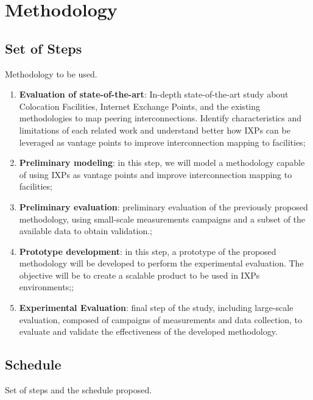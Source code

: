 \chapter{Methodology}\label{cap:methodology}
\thispagestyle{empty}

\section{Set of Steps}
\label{sec:steps}

Methodology to be used.

\begin{enumerate}
\item {\bf Evaluation of state-of-the-art}: In-depth state-of-the-art study about Colocation Facilities, Internet Exchange Points, and the existing methodologies to map peering interconnections. Identify characteristics and limitations of each related work and understand better how IXPs can be leveraged as vantage points to improve interconnection mapping to facilities;

\item {\bf Preliminary modeling}: in this step, we will model a methodology capable of using IXPs as vantage points and improve interconnection mapping to facilities;

\item {\bf Preliminary evaluation}: preliminary evaluation of the previously proposed methodology, using small-scale measurements campaigns and a subset of the available data to obtain validation.;

\item {\bf Prototype development}: in this step, a prototype of the proposed methodology will be developed to perform the experimental evaluation. The objective will be to create a scalable product to be used in IXPs environments;;

\item {\bf Experimental Evaluation}: final step of the study, including large-scale evaluation, composed of campaigns of measurements and data collection, to evaluate and validate the effectiveness of the developed methodology.

\end{enumerate}

\section{Schedule}
\label{sec:schedule}

Set of steps and the schedule proposed.

